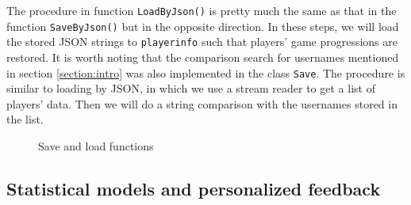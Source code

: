 \documentclass[msc,deptreport,ai]{infthesis}      %
\begin{document}
The procedure in function \texttt{LoadByJson()} is pretty much the same as that in the function \texttt{SaveByJson()} but in the opposite direction. In these steps, we will load the stored JSON strings to \texttt{playerinfo} such that players' game progressions are restored. It is worth noting that the comparison search for usernames mentioned in section \ref{section:intro} was also implemented in the class \texttt{Save}. The procedure is similar to loading by JSON, in which we use a stream reader to get a list of players' data. Then we will do a string comparison with the usernames stored in the list.

\begin{figure}[htbp]
\center
{}\hspace{-1pt}%
\hspace{-1pt}%
\caption{Save and load functions}
\label{fig:Save/Load}
\end{figure}

\subsection{Statistical models and personalized feedback}
\end{document}

